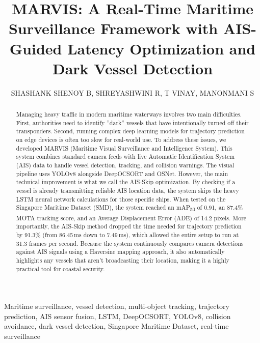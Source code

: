 \documentclass{ieeeaccess}
\begin{document}
\title{MARVIS: A Real-Time Maritime Surveillance Framework with AIS-Guided Latency Optimization and Dark Vessel Detection}

\author{\uppercase{Shashank Shenoy B}, 
\uppercase{Shreyashwini R}, 
\uppercase{T Vinay}, 
\uppercase{Manonmani S}}

\address[1]{Department of Computer Science and Engineering, 
R. V. College of Engineering, Bengaluru, Karnataka, India -- 560059}


\begin{abstract}
Managing heavy traffic in modern maritime waterways involves two main difficulties. First, authorities need to identify ''dark'' vessels that have intentionally turned off their transponders. Second, running complex deep learning models for trajectory prediction on edge devices is often too slow for real-world use. To address these issues, we developed MARVIS (Maritime Visual Surveillance and Intelligence System). This system combines standard camera feeds with live Automatic Identification System (AIS) data to handle vessel detection, tracking, and collision warnings. The visual pipeline uses YOLOv8 alongside DeepOCSORT and OSNet. However, the main technical improvement is what we call the AIS-Skip optimization. By checking if a vessel is already transmitting reliable AIS location data, the system skips the heavy LSTM neural network calculations for those specific ships. When tested on the Singapore Maritime Dataset (SMD), the system reached an mAP\textsubscript{50} of 0.91, an 87.4\% MOTA tracking score, and an Average Displacement Error (ADE) of 14.2 pixels. More importantly, the AIS-Skip method dropped the time needed for trajectory prediction by 91.3\% (from 86.45\,ms down to 7.49\,ms), which allowed the entire setup to run at 31.3 frames per second. Because the system continuously compares camera detections against AIS signals using a Haversine mapping approach, it also automatically highlights any vessels that aren't broadcasting their location, making it a highly practical tool for coastal security.
\end{abstract}

\begin{keywords}
Maritime surveillance, vessel detection, multi-object tracking, trajectory prediction, AIS sensor fusion, LSTM, DeepOCSORT, YOLOv8, collision avoidance, dark vessel detection, Singapore Maritime Dataset, real-time surveillance
\end{keywords}
\end{document}
